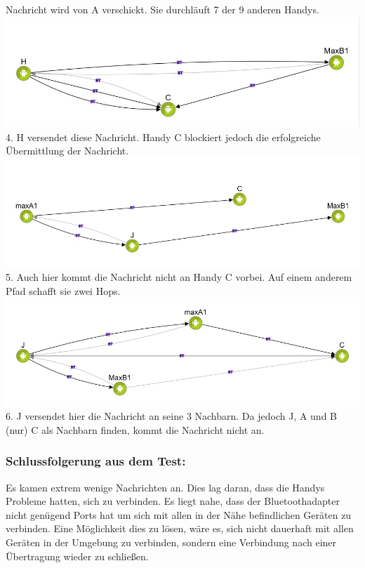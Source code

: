 Nachricht wird von A verschickt. Sie durchläuft 7 der 9 anderen Handys.\\
\includegraphics[width=1.0\textwidth]{belege/grosstests/Bilder/Miserfolg3.jpg}\\ 4. H versendet
diese Nachricht. Handy C blockiert jedoch die erfolgreiche Übermittlung
der Nachricht. \\
\includegraphics[width=1.0\textwidth]{belege/grosstests/Bilder/Miserfolg2.jpg}\\
5. Auch hier kommt die Nachricht nicht an Handy C vorbei. Auf einem
anderem Pfad schafft sie zwei Hops.\\
\includegraphics[width=1.0\textwidth]{belege/grosstests/Bilder/Miserfolg1.jpg}\\ 6. J versendet
hier die Nachricht an seine 3 Nachbarn. Da jedoch J, A und B (nur) C als
Nachbarn finden, kommt die Nachricht nicht an.\\

\subsubsection{Schlussfolgerung aus dem
Test:}\label{schlussfolgerung-aus-dem-test}

Es kamen extrem wenige Nachrichten an. Dies lag daran, dass die Handys
Probleme hatten, sich zu verbinden. Es liegt nahe, dass der
Bluetoothadapter nicht genügend Ports hat um sich mit allen in der Nähe
befindlichen Geräten zu verbinden. Eine Möglichkeit dies zu lösen, wäre
es, sich nicht dauerhaft mit allen Geräten in der Umgebung zu verbinden,
sondern eine Verbindung nach einer Übertragung wieder zu schließen.

